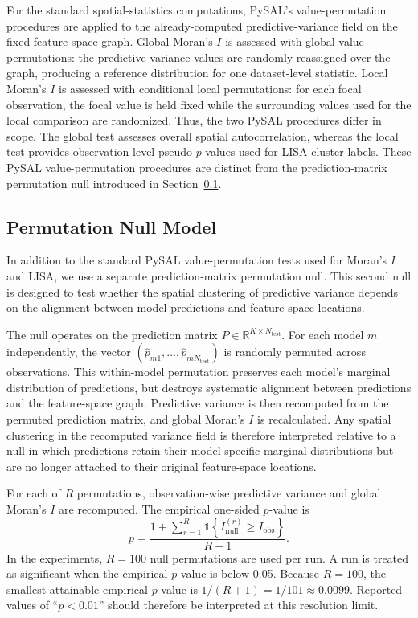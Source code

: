 For the standard spatial-statistics computations, PySAL's value-permutation procedures
are applied to the already-computed predictive-variance field on the fixed feature-space
graph. Global Moran's $I$ is assessed with global value permutations: the predictive
variance values are randomly reassigned over the graph, producing a reference
distribution for one dataset-level statistic. Local Moran's $I$ is assessed with conditional
local permutations: for each focal observation, the focal value is held fixed while the
surrounding values used for the local comparison are randomized. Thus, the two PySAL
procedures differ in scope. The global test assesses overall spatial autocorrelation,
whereas the local test provides observation-level pseudo-$p$-values used for LISA cluster
labels. These PySAL value-permutation procedures are distinct from the
prediction-matrix permutation null introduced in Section~\ref{sec:meth-null}.

\subsection{Permutation Null Model}
\label{sec:meth-null}
\label{sec:exp-null}

In addition to the standard PySAL value-permutation tests used for Moran's $I$ and LISA,
we use a separate prediction-matrix permutation null. This second null is designed to test
whether the spatial clustering of predictive variance depends on the alignment between
model predictions and feature-space locations.

The null operates on the prediction matrix $P \in \mathbb{R}^{K \times N_{\mathrm{test}}}$. For each model
$m$ independently, the vector $(\hat{p}_{m1},\dots,\hat{p}_{mN_{\mathrm{test}}})$ is randomly permuted
across observations. This within-model permutation preserves each model's marginal
distribution of predictions, but destroys systematic alignment between predictions and
the feature-space graph. Predictive variance is then recomputed from the permuted
prediction matrix, and global Moran's $I$ is recalculated. Any spatial clustering in the recomputed
variance field is therefore interpreted relative to
a null in which predictions retain their model-specific marginal distributions but are no
longer attached to their original feature-space locations.

For each of \(R\) permutations, observation-wise predictive variance and global
Moran's \(I\) are recomputed. The empirical one-sided \(p\)-value is
\[
p =
\frac{
    1 + \sum_{r=1}^{R}
    \mathds{1}\!\left\{ I_{\mathrm{null}}^{(r)} \ge I_{\mathrm{obs}} \right\}
}{
    R + 1
}.
\]
In the experiments, $R=100$ null permutations are used per run. A run is treated as
significant when the empirical $p$-value is below 0.05. Because $R=100$, the smallest
attainable empirical $p$-value is $1/(R+1)=1/101\approx 0.0099$. Reported values of
``$p<0.01$'' should therefore be interpreted at this resolution limit.

